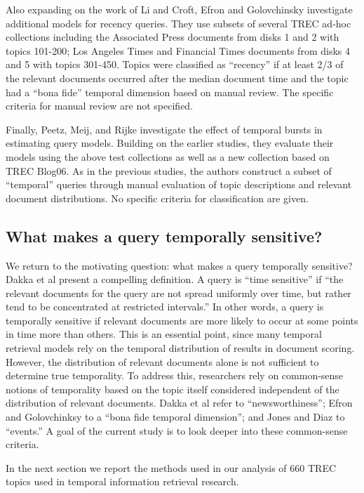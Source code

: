 \documentclass[runningheads,a4paper]{llncs}
\begin{document}
Also expanding on the work of Li and Croft, Efron and Golovchinsky \cite{Efron2011} investigate additional models for recency queries. They use subsets of several TREC ad-hoc collections including the Associated Press documents from disks 1 and 2 with topics 101-200; Los Angeles Times and Financial Times documents from disks 4 and 5 with topics 301-450.  Topics were classified as ``recency'' if at least 2/3 of the relevant documents occurred after the median document time and the topic had a ``bona fide'' temporal dimension based on manual review. The specific criteria for manual review are not specified.  

Finally, Peetz, Meij, and Rijke \cite{Peetz2013} investigate the effect of temporal bursts in estimating query models. Building on the earlier studies, they evaluate their models using the above test collections as well as a new collection based on TREC Blog06. As in the previous studies, the authors construct a subset of ``temporal'' queries through manual evaluation of topic descriptions and relevant document distributions. No specific criteria for classification are given.

\subsection{What makes a query temporally sensitive?}

We return to the motivating question: what makes a query temporally sensitive? Dakka et al \cite{Dakka2012} present a compelling definition. A query is ``time sensitive''  if  ``the relevant documents for the query are not spread uniformly over time, but rather tend to be concentrated at restricted intervals.''  In other words, a query is temporally sensitive if relevant documents are more likely to occur at some points in time more than others. This is an essential point, since many temporal retrieval models rely on the temporal distribution of results in document scoring. However, the distribution of relevant documents alone is not sufficient to determine true temporality. To address this, researchers rely on common-sense notions of temporality based on the topic itself considered independent of the distribution of relevant documents. Dakka et al refer to ``newsworthiness''; Efron and Golovchinksy to a ``bona fide temporal dimension''; and Jones and Diaz to ``events.''  A goal of the current study is to look deeper into these common-sense criteria.

In the next section we report the methods used in our analysis of  660 TREC topics used in temporal information retrieval research. 
\end{document}
